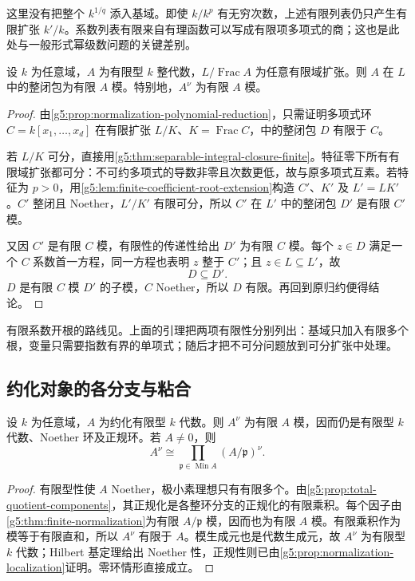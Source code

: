 这里没有把整个 \(k^{1/q}\) 添入基域。即使 \(k/k^p\) 有无穷次数，上述有限列表仍只产生有限扩张 \(k'/k\)。系数列表有限来自有理函数可以写成有限项多项式的商；这也是此处与一般形式幂级数问题的关键差别。

\begin{theorem}\label{g5:thm:finite-normalization}
	设 \(k\) 为任意域，\(A\) 为有限型 \(k\) 整代数，\(L/\operatorname{Frac}A\) 为任意有限域扩张。则 \(A\) 在 \(L\) 中的整闭包为有限 \(A\) 模。特别地，\(A^\nu\) 为有限 \(A\) 模。
\end{theorem}
\begin{proof}
	由\cref{g5:prop:normalization-polynomial-reduction}，只需证明多项式环 \(C=k[x_1,\ldots,x_d]\) 在有限扩张 \(L/K\)、\(K=\operatorname{Frac}C\)，中的整闭包 \(D\) 有限于 \(C\)。

	若 \(L/K\) 可分，直接用\cref{g5:thm:separable-integral-closure-finite}。特征零下所有有限域扩张都可分：不可约多项式的导数非零且次数更低，故与原多项式互素。若特征为 \(p>0\)，用\cref{g5:lem:finite-coefficient-root-extension}构造 \(C'\)、\(K'\) 及 \(L'=LK'\)。\(C'\) 整闭且 Noether，\(L'/K'\) 有限可分，所以 \(C'\) 在 \(L'\) 中的整闭包 \(D'\) 是有限 \(C'\) 模。

	又因 \(C'\) 是有限 \(C\) 模，有限性的传递性给出 \(D'\) 为有限 \(C\) 模。每个 \(z\in D\) 满足一个 \(C\) 系数首一方程，同一方程也表明 \(z\) 整于 \(C'\)；且 \(z\in L\subseteq L'\)，故
	\[
		D\subseteq D'.
	\]
	\(D\) 是有限 \(C\) 模 \(D'\) 的子模，\(C\) Noether，所以 \(D\) 有限。再回到原归约便得结论。
\end{proof}

有限系数开根的路线见\cite[第33节，第262--263页]{Matsumura1989}。上面的引理把两项有限性分别列出：基域只加入有限多个根，变量只需要指数有界的单项式；随后才把不可分问题放到可分扩张中处理。

\subsection{约化对象的各分支与粘合}
\label{g5:subsec:0402:05}

\begin{corollary}\label{g5:cor:reduced-finite-normalization}
	设 \(k\) 为任意域，\(A\) 为约化有限型 \(k\) 代数。则 \(A^\nu\) 为有限 \(A\) 模，因而仍是有限型 \(k\) 代数、Noether 环及正规环。若 \(A\ne0\)，则
	\[
		A^\nu\cong\prod_{\mathfrak p\in\operatorname{Min}A}
		(A/\mathfrak p)^\nu.
	\]
\end{corollary}
\begin{proof}
	有限型性使 \(A\) Noether，极小素理想只有有限多个。由\cref{g5:prop:total-quotient-components}，其正规化是各整环分支的正规化的有限乘积。每个因子由\cref{g5:thm:finite-normalization}为有限 \(A/\mathfrak p\) 模，因而也为有限 \(A\) 模。有限乘积作为模等于有限直和，所以 \(A^\nu\) 有限于 \(A\)。模生成元也是代数生成元，故 \(A^\nu\) 为有限型 \(k\) 代数；Hilbert 基定理给出 Noether 性，正规性则已由\cref{g5:prop:normalization-localization}证明。零环情形直接成立。
\end{proof}

